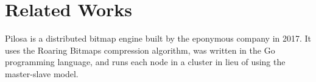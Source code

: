 \section{Related Works}
Pilosa \cite{pilosa2017} is a distributed bitmap engine built by the eponymous company in
2017. It uses the Roaring Bitmaps compression algorithm, was written in the
Go programming language, and runs each node in a cluster in lieu of using
the master-slave model.
